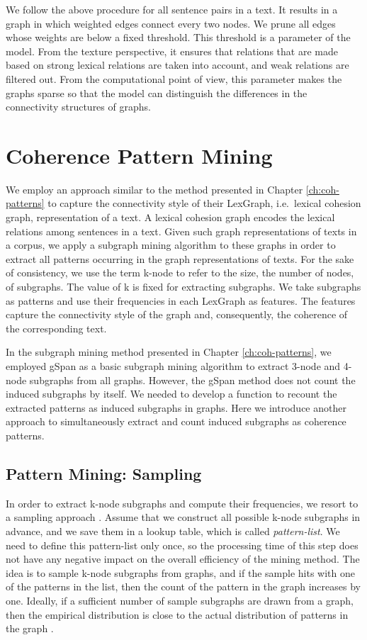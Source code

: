We follow the above procedure for all sentence pairs in a text. 
It results in a graph in which weighted edges connect every two nodes.    
We prune all edges whose weights are below a fixed threshold. 
This threshold is a parameter of the model.
From the texture perspective, it ensures that relations that are made based on strong lexical relations are taken into account, and weak relations are filtered out. 
From the computational point of view, this parameter makes the graphs sparse so that the model can distinguish the differences in the connectivity structures of graphs. 

\section{Coherence Pattern Mining}
\label{sec:lex-graph-pattern-mining}

We employ an approach similar to the method presented in Chapter \ref{ch:coh-patterns} to capture the connectivity style of their LexGraph, i.e.\ lexical cohesion graph, representation of a text. 
A lexical cohesion graph encodes the lexical relations among sentences in a text. 
Given such graph representations of texts in a corpus, we apply a subgraph mining algorithm to these graphs in order to extract all patterns occurring in the graph representations of texts.  
For the sake of consistency, we use the term k-node to refer to the size, the number of nodes, of subgraphs.  
The value of k is fixed for extracting subgraphs. 
We take subgraphs as patterns and use their frequencies in each \mbox{LexGraph} as features.  
The features capture the connectivity style of the graph and, consequently, the coherence of the corresponding text.   

In the subgraph mining method presented in Chapter \ref{ch:coh-patterns}, we employed gSpan as a basic subgraph mining algorithm to extract 3-node and 4-node subgraphs from all graphs. 
However, the gSpan method does not count the induced subgraphs by itself. 
We needed to develop a function to recount the extracted patterns as induced subgraphs in graphs.  
Here we introduce another approach to simultaneously extract and count induced subgraphs as coherence patterns. 

\subsection{Pattern Mining: Sampling}
In order to extract k-node subgraphs and compute their frequencies, we resort to a sampling approach \cite{weissman03,shervashidze09}. 
Assume that we construct all possible k-node subgraphs in advance, and we save them in a lookup table, which is called \emph{pattern-list}.  
We need to define this pattern-list only once, so the processing time of this step does not have any negative impact on the overall efficiency of the mining method.  
The idea is to sample k-node subgraphs from graphs, and if the sample hits with one of the patterns in the list, then the count of the pattern in the graph increases by one. 
Ideally, if a sufficient number of sample subgraphs are drawn from a graph, then the empirical distribution is close to the actual distribution of patterns in the graph \cite{shervashidze09}.  

